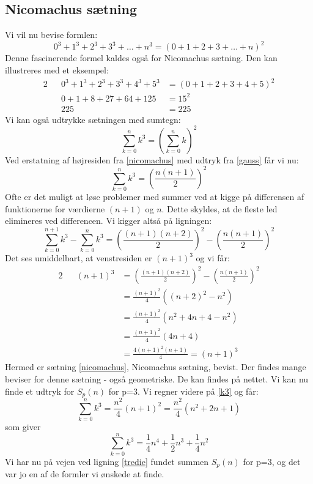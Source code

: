 \subsection{Nicomachus sætning}
Vi vil nu bevise formlen: \[0^3+1^3+2^3+3^3+ \ldots +n^3=(0+1+2+3+\ldots +n)^2\]
Denne fascinerende formel kaldes også for Nicomachus sætning. Den kan illustreres med et eksempel:
\begin{alignat*}{2}
&&0^3+1^3+2^3+3^3+4^3+5^3&=(0+1+2+3+4+5)^2\\
&&0+1+8+27+64+125&=15^2\\
&&225&=225
\end{alignat*}
Vi kan også udtrykke sætningen med sumtegn:
\begin{equation}
\sum_{k=0}^{n}k^3=\left(\sum_{k=0}^{n}k\right)^2\label{nicomachus}
\end{equation}
Ved erstatning af højresiden fra \ref{nicomachus} med udtryk fra \ref{gauss} får vi nu:
\begin{equation}
\sum_{k=0}^{n}k^3=\left(\frac{n(n+1)}{2}\right)^2\label{k3}
\end{equation}
Ofte er det muligt at løse problemer med summer ved at kigge på differensen af funktionerne for værdierne \((n+1)\) og \(n\). Dette skyldes, at de fleste led elimineres ved differencen. Vi kigger altså på ligningen:
\[\sum_{k=0}^{n+1}k^3-\sum_{k=0}^{n}k^3=\left(\frac{(n+1)(n+2)}{2}\right)^2-\left(\frac{n(n+1)}{2}\right)^2\]
Det ses umiddelbart, at venstresiden er \((n+1)^3\) og vi får:
\begin{alignat*}{2}
&&(n+1)^3&= \left(\frac{(n+1)(n+2)}{2}\right)^2-\left(\frac{n(n+1)}{2}\right)^2\\
&&&=\frac{(n+1)^2}{4}\left((n+2)^2-n^2\right)\\
&&&=\frac{(n+1)^2}{4}\left(n^2+4n+4-n^2\right)\\
&&&=\frac{(n+1)^2}{4}(4n+4)\\
&&&=\frac{4(n+1)^2(n+1)}{4}=(n+1)^3
\end{alignat*}
Hermed er sætning \ref{nicomachus}, Nicomachus sætning, bevist. Der findes mange beviser for denne sætning - også geometriske. De kan findes på nettet.
Vi kan nu finde et udtryk for \(S_p(n)\) for p=3. Vi regner videre på \ref{k3} og får:
\[\sum_{k=0}^{n}k^3=\frac{n^2}{4}(n+1)^2=\frac{n^2}{4}(n^2+2n+1)\]
som giver
\begin{equation}
\sum_{k=0}^{n}k^3=\frac{1}{4}n^4+\frac{1}{2}n^3+\frac{1}{4}n^2
\label{tredie}
\end{equation}
Vi har nu på vejen ved ligning \ref{tredie} fundet summen \(S_p(n)\) for p=3, og det var jo en af de formler vi ønskede at finde.
